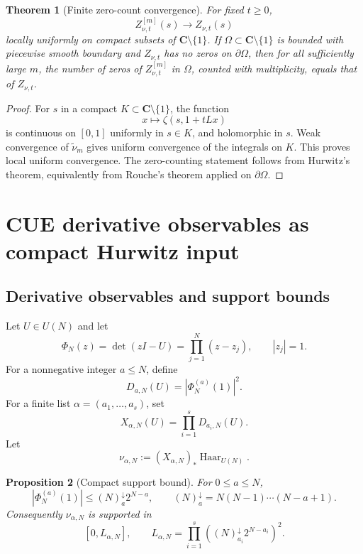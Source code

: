 \documentclass[11pt]{article}
\newcommand{\C}{\mathbf C}
\newcommand{\Haar}{\operatorname{Haar}}
\newcommand{\fall}[2]{(#1)^{\downarrow}_{#2}}
\theoremstyle{plain}
\newtheorem{theorem}{Theorem}[section]
\newtheorem{proposition}[theorem]{Proposition}
\theoremstyle{definition}
\begin{document}
\begin{theorem}[Finite zero-count convergence]\label{thm:finite-zero-stack}
For fixed \(t\ge0\),
\[
   Z_{\nu,t}^{[m]}(s)\to Z_{\nu,t}(s)
\]
locally uniformly on compact subsets of \(\C\setminus\{1\}\).  If \(\Omega\subset\C\setminus\{1\}\) is bounded with piecewise smooth boundary and \(Z_{\nu,t}\) has no zeros on \(\partial\Omega\), then for all sufficiently large \(m\), the number of zeros of \(Z_{\nu,t}^{[m]}\) in \(\Omega\), counted with multiplicity, equals that of \(Z_{\nu,t}\).
\end{theorem}

\begin{proof}
For \(s\) in a compact \(K\subset\C\setminus\{1\}\), the function
\[
   x\mapsto \zeta(s,1+tLx)
\]
is continuous on \([0,1]\) uniformly in \(s\in K\), and holomorphic in \(s\).  Weak convergence of \(\widetilde\nu_m\) gives uniform convergence of the integrals on \(K\).  This proves local uniform convergence.  The zero-counting statement follows from Hurwitz's theorem, equivalently from Rouche's theorem applied on \(\partial\Omega\).
\end{proof}

\section{CUE derivative observables as compact Hurwitz input}

\subsection{Derivative observables and support bounds}

Let \(U\in U(N)\) and let
\[
   \Phi_N(z)=\det(zI-U)=\prod_{j=1}^N(z-z_j),
   \qquad |z_j|=1.
\]
For a nonnegative integer \(a\le N\), define
\[
   D_{a,N}(U)=|\Phi_N^{(a)}(1)|^2.
\]
For a finite list \(\alpha=(a_1,\ldots,a_s)\), set
\[
   X_{\alpha,N}(U)=\prod_{i=1}^sD_{a_i,N}(U).
\]
Let
\[
   \nu_{\alpha,N}:=(X_{\alpha,N})_*\Haar_{U(N)}.
\]

\begin{proposition}[Compact support bound]\label{prop:derivative-support-bound}
For \(0\le a\le N\),
\[
   |\Phi_N^{(a)}(1)|\le \fall{N}{a}2^{N-a},
   \qquad
   \fall{N}{a}=N(N-1)\cdots(N-a+1).
\]
Consequently \(\nu_{\alpha,N}\) is supported in
\[
   \left[0,L_{\alpha,N}\right],
   \qquad
   L_{\alpha,N}=\prod_{i=1}^s\left(\fall{N}{a_i}2^{N-a_i}\right)^2.
\]
\end{proposition}
\end{document}
